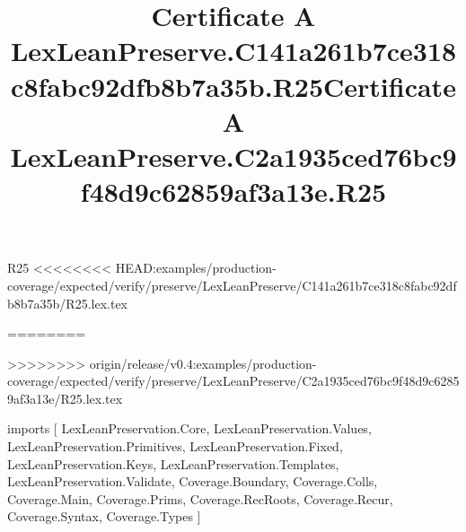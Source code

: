 \begin{lexlean}{R25}
<<<<<<<< HEAD:examples/production-coverage/expected/verify/preserve/LexLeanPreserve/C141a261b7ce318c8fabc92dfb8b7a35b/R25.lex.tex
\title{Certificate A LexLeanPreserve.C141a261b7ce318c8fabc92dfb8b7a35b.R25}
========
\title{Certificate A LexLeanPreserve.C2a1935ced76bc9f48d9c62859af3a13e.R25}
>>>>>>>> origin/release/v0.4:examples/production-coverage/expected/verify/preserve/LexLeanPreserve/C2a1935ced76bc9f48d9c62859af3a13e/R25.lex.tex
\begin{coremodule}
imports [
  LexLeanPreservation.Core,
  LexLeanPreservation.Values,
  LexLeanPreservation.Primitives,
  LexLeanPreservation.Fixed,
  LexLeanPreservation.Keys,
  LexLeanPreservation.Templates,
  LexLeanPreservation.Validate,
  Coverage.Boundary,
  Coverage.Colls,
  Coverage.Main,
  Coverage.Prims,
  Coverage.RecRoots,
  Coverage.Recur,
  Coverage.Syntax,
  Coverage.Types
]


\end{coremodule}
\end{lexlean}
